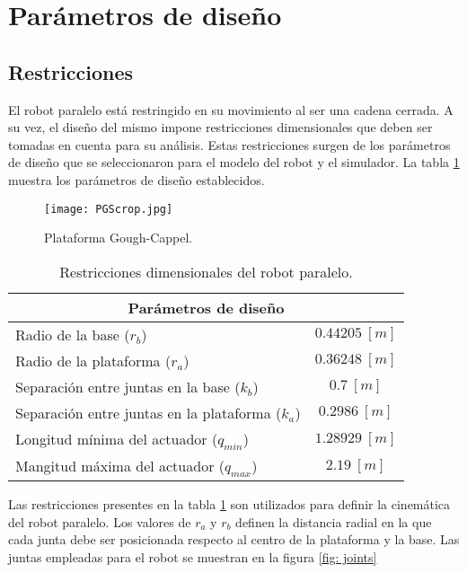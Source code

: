 \section{Parámetros de diseño}

\subsection{Restricciones}
El robot paralelo está restringido en su movimiento 
al ser una cadena cerrada.
A su vez, el diseño del mismo impone restricciones dimensionales 
que deben ser tomadas en cuenta para su análisis.
Estas restricciones surgen de los parámetros de diseño que 
se seleccionaron para el modelo del robot y el simulador.
La tabla \ref{tab: restricciones} muestra los 
parámetros de diseño establecidos.

\begin{figure}[htb!]
 \centering
 \texttt{[image: PGScrop.jpg]}
 \caption{Plataforma Gough-Cappel.}
 \label{fig: cad}
\end{figure}


\begin{table}[htb!]
\centering
\begin{tabular}{lc}

\multicolumn{2}{c}{Parámetros de diseño} \\ \hline
Radio de la base ($r_b$) & $0.44205 \ [m]$ \\ 
Radio de la plataforma ($r_a$) & $0.36248 \ [m]$ \\ 
Separación entre juntas en la base ($k_b$) & $0.7 \ [m]$ \\ 
Separación entre juntas en la plataforma ($k_a$) & $0.2986 \ [m]$ \\ 
Longitud mínima del actuador ($q_{min}$) & $1.28929 \ [m]$ \\ 
Mangitud máxima del actuador ($q_{max}$) &  $2.19 \ [m]$ \\ 
\end{tabular}
\caption{Restricciones dimensionales del robot paralelo.}
\label{tab: restricciones}
\end{table}

Las restricciones presentes en la tabla \ref{tab: restricciones}
son utilizados para definir la cinemática del robot paralelo.
Los valores de $r_a$ y $r_b$ definen la 
distancia radial en la que cada junta debe ser 
posicionada respecto al centro de la plataforma y la base.
Las juntas empleadas para el robot se muestran 
en la figura \ref{fig: joints}

